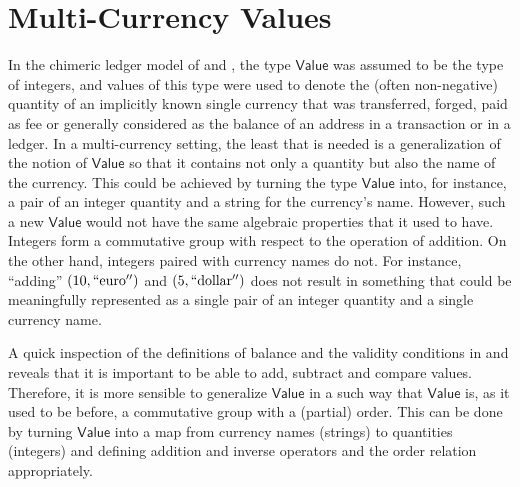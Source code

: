 \documentclass{llncs}
\newcommand{\type}[1]{\mathsf{#1}}
\newcommand{\valueT}{\type{Value}}
\begin{document}
\section{Multi-Currency Values}
\label{sec:MultiCurrencyValues}

In the chimeric ledger model of \cite{ChimericLedgers} and \cite{UTxOScripts}, the type $\valueT$ was assumed to be the type of integers, and values of this type were used to denote the (often non-negative) quantity of an implicitly known single currency that was transferred, forged, paid as fee or generally considered as the balance of an address in a transaction or in a ledger. In a multi-currency setting, the least that is needed is a generalization of the notion of $\valueT$ so that it contains not only a quantity but also the name of the currency. This could be achieved by turning the type $\valueT$ into, for instance, a pair of an integer quantity and a string for the currency's name. However, such a new $\valueT$ would not have the same algebraic properties that it used to have. Integers form a commutative group with respect to the operation of addition. On the other hand, integers paired with currency names do not. For instance, ``adding'' $(10, \mathrm{``euro''})$ and $(5, \mathrm{``dollar''})$ does not result in something that could be meaningfully represented as a single pair of an integer quantity and a single currency name. 

A quick inspection of the definitions of balance and the validity conditions in \cite{ChimericLedgers} and \cite{UTxOScripts} reveals that it is important to be able to add, subtract and compare values. Therefore, it is more sensible to generalize $\valueT$ in a such way that $\valueT$ is, as it used to be before, a commutative group with a (partial) order. This can be done by turning $\valueT$ into a map from currency names (strings) to quantities (integers) and defining addition and inverse operators and the order relation appropriately.
\end{document}
